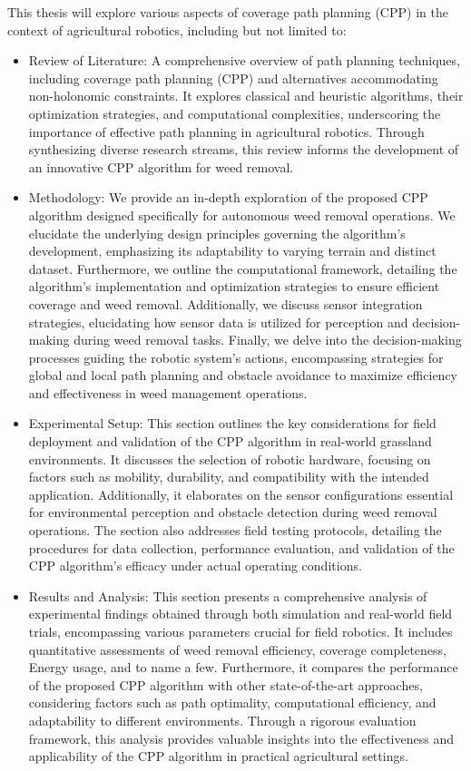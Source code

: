 This thesis will explore various aspects of coverage path planning (CPP) in the context of agricultural robotics, including but not limited to:
\begin{itemize}

  \item Review of Literature: A comprehensive overview of path planning techniques, including coverage path planning (CPP) and alternatives accommodating non-holonomic constraints. It explores classical and heuristic algorithms, their optimization strategies, and computational complexities, underscoring the importance of effective path planning in agricultural robotics. Through synthesizing diverse research streams, this review informs the development of an innovative CPP algorithm for weed removal.
  
  \item Methodology: We provide an in-depth exploration of the proposed CPP algorithm designed specifically for autonomous weed removal operations. We elucidate the underlying design principles governing the algorithm's development, emphasizing its adaptability to varying terrain and distinct dataset. Furthermore, we outline the computational framework, detailing the algorithm's implementation and optimization strategies to ensure efficient coverage and weed removal. Additionally, we discuss sensor integration strategies, elucidating how sensor data is utilized for perception and decision-making during weed removal tasks. Finally, we delve into the decision-making processes guiding the robotic system's actions, encompassing strategies for global and local path planning and obstacle avoidance to maximize efficiency and effectiveness in weed management operations.
  
  \item Experimental Setup: This section outlines the key considerations for field deployment and validation of the CPP algorithm in real-world grassland environments. It discusses the selection of robotic hardware, focusing on factors such as mobility, durability, and compatibility with the intended application. Additionally, it elaborates on the sensor configurations essential for environmental perception and obstacle detection during weed removal operations. The section also addresses field testing protocols, detailing the procedures for data collection, performance evaluation, and validation of the CPP algorithm's efficacy under actual operating conditions.
  
  \item Results and Analysis: This section presents a comprehensive analysis of experimental findings obtained through both simulation and real-world field trials, encompassing various parameters crucial for field robotics. It includes quantitative assessments of weed removal efficiency, coverage completeness, Energy usage, and to name a few. Furthermore, it compares the performance of the proposed CPP algorithm with other state-of-the-art approaches, considering factors such as path optimality, computational efficiency, and adaptability to different environments. Through a rigorous evaluation framework, this analysis provides valuable insights into the effectiveness and applicability of the CPP algorithm in practical agricultural settings.
  

\end{itemize}
